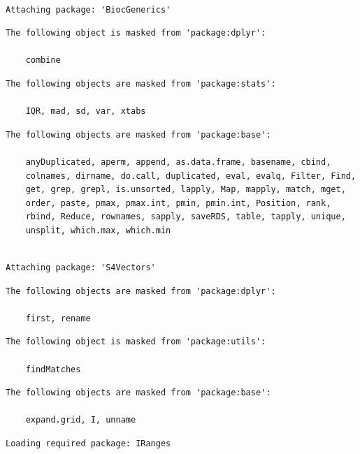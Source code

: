 \documentclass[
  letterpaper,
  DIV=11,
  numbers=noendperiod]{scrartcl}
\begin{document}
\begin{verbatim}

Attaching package: 'BiocGenerics'
\end{verbatim}

\begin{verbatim}
The following object is masked from 'package:dplyr':

    combine
\end{verbatim}

\begin{verbatim}
The following objects are masked from 'package:stats':

    IQR, mad, sd, var, xtabs
\end{verbatim}

\begin{verbatim}
The following objects are masked from 'package:base':

    anyDuplicated, aperm, append, as.data.frame, basename, cbind,
    colnames, dirname, do.call, duplicated, eval, evalq, Filter, Find,
    get, grep, grepl, is.unsorted, lapply, Map, mapply, match, mget,
    order, paste, pmax, pmax.int, pmin, pmin.int, Position, rank,
    rbind, Reduce, rownames, sapply, saveRDS, table, tapply, unique,
    unsplit, which.max, which.min
\end{verbatim}

\begin{verbatim}

Attaching package: 'S4Vectors'
\end{verbatim}

\begin{verbatim}
The following objects are masked from 'package:dplyr':

    first, rename
\end{verbatim}

\begin{verbatim}
The following object is masked from 'package:utils':

    findMatches
\end{verbatim}

\begin{verbatim}
The following objects are masked from 'package:base':

    expand.grid, I, unname
\end{verbatim}

\begin{verbatim}
Loading required package: IRanges
\end{verbatim}
\end{document}
